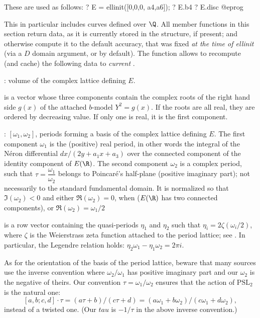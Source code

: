 \noindent These are used as follows:
\bprog
? E = ellinit([0,0,0, a4,a6]);
? E.b4
? E.disc
@eprog


This in particular includes curves defined over $\Q$. All member functions in
this section return data, as it is currently stored in the structure, if
present; and otherwise compute it to the default accuracy, that was fixed
\emph{at the time of ellinit} (via a  $D$ domain argument, or
 by default). The function  allows to
recompute (and cache) the following data to \emph{current}
.

\item {}: volume of the complex lattice defining $E$.

\item {} is a vector whose three components contain the complex
roots of the right hand side $g(x)$ of the attached $b$-model $Y^2 = g(x)$.
If the roots are all real, they are ordered by decreasing value. If only one
is real, it is the first component.

\item {}: $[\omega_1,\omega_2]$, periods forming a basis of the
complex lattice defining $E$. The first component $\omega_1$ is the
(positive) real period, in other words the integral of the N\'eron
differential $dx/(2y+a_1x+a_3)$
over the connected component of the identity component of $E(\R)$.
The second component $\omega_2$ is a complex period, such that
$\tau=\dfrac{\omega_1}{\omega_2}$ belongs to Poincar\'e's
half-plane (positive imaginary part); not necessarily to the standard
fundamental domain. It is normalized so that $\Im(\omega_2) < 0$
and either $\Re(\omega_2) = 0$, when  ($E(\R)$ has two connected
components), or $\Re(\omega_2) = \omega_1/2$

\item {} is a row vector containing the quasi-periods $\eta_1$ and
$\eta_2$ such that $\eta_i = 2\zeta(\omega_i/2)$, where $\zeta$ is the
Weierstrass zeta function attached to the period lattice; see
. In particular, the Legendre relation holds: $\eta_2\omega_1 -
\eta_1\omega_2 = 2\pi i$.

 As for the orientation of the basis of the period lattice,
beware that many sources use the inverse convention where $\omega_2/\omega_1$
has positive imaginary part and our $\omega_2$ is the negative of theirs. Our
convention $\tau = \omega_1/\omega_2$  ensures that the action of $\text{PSL}_2$ is the natural
one:
$$[a,b;c,d]\cdot\tau = (a\tau+b)/(c\tau+d)
  = (a \omega_1 + b\omega_2)/(c\omega_1 + d\omega_2),$$
instead of a twisted one. (Our $tau$ is $-1/\tau$ in the above inverse
convention.)

